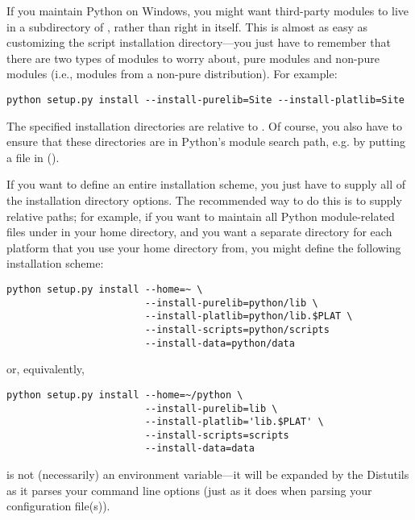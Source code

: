 \documentclass{howto}
\begin{document}
If you maintain Python on Windows, you might want third-party modules to
live in a subdirectory of , rather than right in
 itself.  This is almost as easy as customizing the
script installation directory---you just have to remember that there are
two types of modules to worry about, pure modules and non-pure modules
(i.e., modules from a non-pure distribution).  For example:
\begin{verbatim}
python setup.py install --install-purelib=Site --install-platlib=Site
\end{verbatim}
The specified installation directories are relative to .
Of course, you also have to ensure that these directories are in
Python's module search path, e.g. by putting a  file in
 ().

If you want to define an entire installation scheme, you just have to
supply all of the installation directory options.  The recommended way
to do this is to supply relative paths; for example, if you want to
maintain all Python module-related files under  in your
home directory, and you want a separate directory for each platform that
you use your home directory from, you might define the following
installation scheme:
\begin{verbatim}
python setup.py install --home=~ \
                        --install-purelib=python/lib \
                        --install-platlib=python/lib.$PLAT \
                        --install-scripts=python/scripts
                        --install-data=python/data
\end{verbatim}
or, equivalently,
\begin{verbatim}
python setup.py install --home=~/python \
                        --install-purelib=lib \
                        --install-platlib='lib.$PLAT' \
                        --install-scripts=scripts
                        --install-data=data
\end{verbatim}
\code{\$PLAT} is not (necessarily) an environment variable---it will be
expanded by the Distutils as it parses your command line options (just
as it does when parsing your configuration file(s)).
\end{document}
